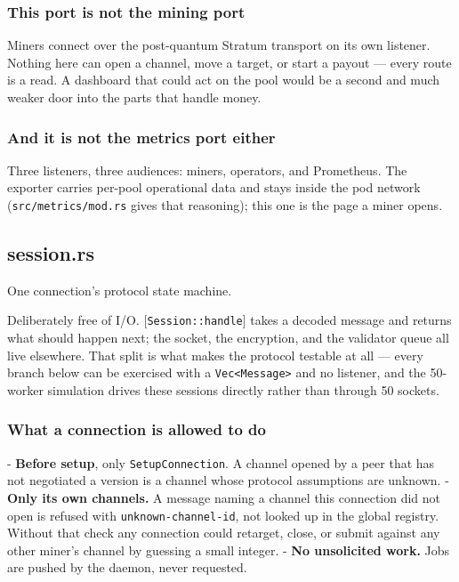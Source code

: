 \documentclass[11pt,a4paper]{article}
\begin{document}
\subsubsection{This port is not the mining port}

Miners connect over the post-quantum Stratum transport on its own listener.
Nothing here can open a channel, move a target, or start a payout — every
route is a read. A dashboard that could act on the pool would be a second
and much weaker door into the parts that handle money.

\subsubsection{And it is not the metrics port either}

Three listeners, three audiences: miners, operators, and Prometheus. The
exporter carries per-pool operational data and stays inside the pod network
(\texttt{src/metrics/mod.rs} gives that reasoning); this one is the page a miner
opens.

\subsection{session.rs}
One connection's protocol state machine.

Deliberately free of I/O. [\texttt{Session::handle}] takes a decoded message and
returns what should happen next; the socket, the encryption, and the
validator queue all live elsewhere. That split is what makes the protocol
testable at all — every branch below can be exercised with a \texttt{Vec<Message>}
and no listener, and the 50-worker simulation drives these sessions directly
rather than through 50 sockets.

\subsubsection{What a connection is allowed to do}

- \textbf{Before setup}, only \texttt{SetupConnection}. A channel opened by a peer that
  has not negotiated a version is a channel whose protocol assumptions are
  unknown.
- \textbf{Only its own channels.} A message naming a channel this connection did
  not open is refused with \texttt{unknown-channel-id}, not looked up in the global
  registry. Without that check any connection could retarget, close, or
  submit against any other miner's channel by guessing a small integer.
- \textbf{No unsolicited work.} Jobs are pushed by the daemon, never requested.
\end{document}
